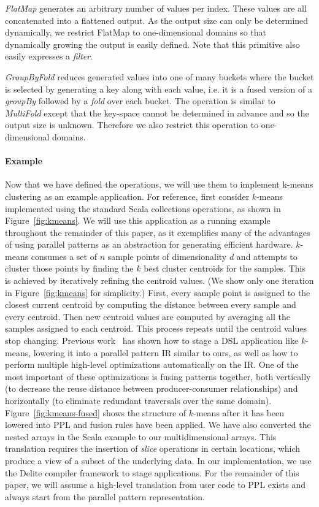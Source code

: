 \emph{FlatMap} generates an arbitrary number of values per index.
These values are all concatenated into a flattened output.
As the output size can only be determined dynamically, we restrict FlatMap to one-dimensional domains so that dynamically growing the output is easily defined.
Note that this primitive also easily expresses a \emph{filter}.

\emph{GroupByFold} reduces generated values into one of many buckets where the bucket is selected by generating a key along with each value, i.e. it is a fused version of a \emph{groupBy} followed by a \emph{fold} over each bucket.
The operation is similar to \emph{MultiFold} except that the key-space cannot be determined in advance and so the output size is unknown.
Therefore we also restrict this operation to one-dimensional domains.


\paragraph{Example}
Now that we have defined the operations, we will use them to implement k-means clustering as an example application.
For reference, first consider $k$-means implemented using the standard Scala collections operations, as shown in Figure~\ref{fig:kmeans}.
We will use this application as a running example throughout the remainder of this paper, as it exemplifies many of the advantages of using parallel patterns as an abstraction for generating efficient hardware.
$k$-means consumes a set of $n$ sample points of dimensionality $d$ and attempts to cluster those points by finding the $k$ best cluster centroids for the samples.
This is achieved by iteratively refining the centroid values.
(We show only one iteration in Figure~\ref{fig:kmeans} for simplicity.)
First, every sample point is assigned to the closest current centroid by computing the distance between every sample and every centroid.
Then new centroid values are computed by averaging all the samples assigned to each centroid.
This process repeats until the centroid values stop changing.
Previous work~\cite{rompf12optimizing,brown16clusters,chambers10flumejava} has shown how to stage a DSL application like $k$-means, lowering it into a parallel pattern IR similar to ours, as well as how to perform multiple high-level optimizations automatically on the IR.
One of the most important of these optimizations is fusing patterns together, both vertically (to decrease the reuse distance between producer-consumer relationships) and horizontally (to eliminate redundant traversals over the same domain).
Figure~\ref{fig:kmeans-fused} shows the structure of $k$-means after it has been lowered into PPL and fusion rules have been applied.
We have also converted the nested arrays in the Scala example to our multidimensional arrays.
This translation requires the insertion of \emph{slice} operations in certain locations, which produce a view of a subset of the underlying data.
In our implementation, we use the Delite compiler framework \cite{delite-tecs14} to stage applications. For the remainder of this paper, we will assume a high-level translation from user code to PPL exists and always start from the parallel pattern representation.
